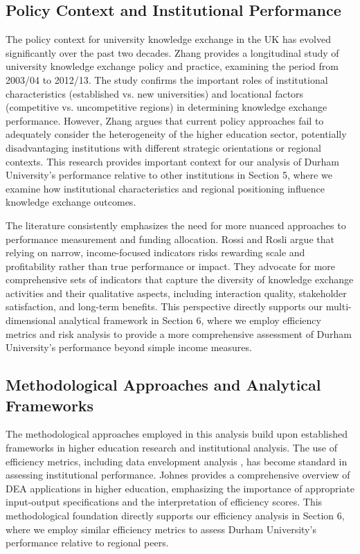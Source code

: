 \documentclass[journal,onecolumn, 10pt,draftclsnofoot]{IEEEtran}
\begin{document}
\subsection{Policy Context and Institutional Performance}

The policy context for university knowledge exchange in the UK has evolved significantly over the past two decades. Zhang \cite{zhang2018theory} provides a longitudinal study of university knowledge exchange policy and practice, examining the period from 2003/04 to 2012/13. The study confirms the important roles of institutional characteristics (established vs. new universities) and locational factors (competitive vs. uncompetitive regions) in determining knowledge exchange performance. However, Zhang argues that current policy approaches fail to adequately consider the heterogeneity of the higher education sector, potentially disadvantaging institutions with different strategic orientations or regional contexts. This research provides important context for our analysis of Durham University's performance relative to other institutions in Section 5, where we examine how institutional characteristics and regional positioning influence knowledge exchange outcomes.

The literature consistently emphasizes the need for more nuanced approaches to performance measurement and funding allocation. Rossi and Rosli \cite{rossi2015indicators} argue that relying on narrow, income-focused indicators risks rewarding scale and profitability rather than true performance or impact. They advocate for more comprehensive sets of indicators that capture the diversity of knowledge exchange activities and their qualitative aspects, including interaction quality, stakeholder satisfaction, and long-term benefits. This perspective directly supports our multi-dimensional analytical framework in Section 6, where we employ efficiency metrics and risk analysis to provide a more comprehensive assessment of Durham University's performance beyond simple income measures.

\subsection{Methodological Approaches and Analytical Frameworks}

The methodological approaches employed in this analysis build upon established frameworks in higher education research and institutional analysis. The use of efficiency metrics, including data envelopment analysis \cite{charnes1978measuring,banker1984models}, has become standard in assessing institutional performance. Johnes \cite{johnes2006data} provides a comprehensive overview of DEA applications in higher education, emphasizing the importance of appropriate input-output specifications and the interpretation of efficiency scores. This methodological foundation directly supports our efficiency analysis in Section 6, where we employ similar efficiency metrics to assess Durham University's performance relative to regional peers.
\end{document}
